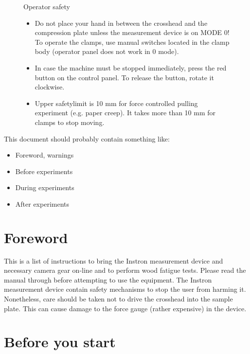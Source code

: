 \documentclass[a4paper]{article}
\begin{document}
\begin{figure}[htb]
  \begin{minipage}[\textwidth]{\textwidth}
    {\color{red}
     {\Large Operator safety}
     \begin{itemize}
       \item Do not place your hand in between the crosshead and the compression plate unless the measurement device is on \textsf{MODE 0}! To operate the clamps, use manual switches located in the clamp body (operator panel does not work in 0 mode). 
       \item In case the machine must be stopped immediately, press the red button on the control panel. To release the button, rotate it clockwise.
  		\item Upper safetylimit is 10 mm for force controlled pulling experiment (e.g. paper creep). It takes more than 10 mm for clamps to stop moving.    
	\end{itemize}
     }
  \end{minipage}
\end{figure}

\begin{framed}
This document should probably contain something like:
\begin{itemize}
  \item Foreword, warnings
  \item Before experiments
  \item During experiments
  \item After experiments
\end{itemize}
\end{framed}


\section{Foreword}

This is a list of instructions to bring the Instron measurement device
and necessary camera gear on-line and to perform wood fatigue
tests. Please read the manual through before attempting to use the
equipment. The Instron measurement device contain safety mechanisms to
stop the user from harming it. Nonetheless, care should be taken not
to drive the crosshead into the sample plate. This can cause damage to
the force gauge (rather expensive) in the device.

\section{Before you start}
\end{document}
